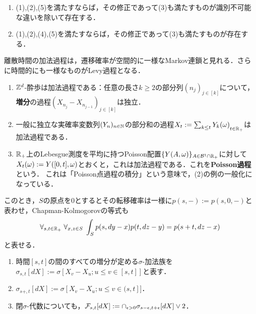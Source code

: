 \documentclass[uplatex,dvipdfmx]{jsreport}
\begin{document}
\begin{theorem}[$D$-変形]\mbox{}
    \begin{enumerate}
        \item (1),(2),(5)を満たすならば，その修正であって(3)も満たすものが識別不可能な違いを除いて存在する．
        \item (1),(2),(4),(5)を満たすならば，その修正であって(3)も満たすものが存在する．
    \end{enumerate}
\end{theorem}

\begin{example}
    離散時間の加法過程は，遷移確率が空間的に一様なMarkov連鎖と見れる．さらに時間的にも一様なものがLevy過程となる．
    \begin{enumerate}
        \item $\mathbb{Z}^d$-酔歩は加法過程である：任意の長さ$k\ge2$の部分列$(n_j)_{j\in[k]}$について，\textbf{増分}の過程$(X_{n_j}-X_{n_{j-1}})_{j\in[k]}$は独立．
        \item 一般に独立な実確率変数列$(Y_n)_{n\in\mathbb{N}}$の部分和の過程${X_t:=\sum_{k\le t}Y_k(\omega)}_{t\in\mathbb{R}_+}$は加法過程である．
        \item $\mathbb{R}_+$上のLebesgue測度を平均に持つPoisson配置$\{Y(A,\omega)\}_{A\in\mathcal{B}^1\cap\mathbb{R}_+}$に対して$X_t(\omega):=Y([0,t],\omega)$とおくと，これは加法過程である．これを\textbf{Poisson過程}という．
        これは「Poisson点過程の積分」という意味で，(2)の例の一般化になっている．
    \end{enumerate}
\end{example}

\begin{remark}
    このとき，$S$の原点を$0$とするとその転移確率は一様に$p(s,-):=p(s,0,-)$と表わせ，Chapman-Kolmogorovの等式も
    \[\forall_{s,t\in\mathbb{R}_+}\;\forall_{x,z\in S}\;\int_Sp(s,dy-x)p(t,dz-y)=p(s+t,dz-x)\]
    と表せる．
\end{remark}

\begin{notation}\mbox{}
    \begin{enumerate}
        \item 時間$[s,t]$の間のすべての増分が定める$\sigma$-加法族を$\sigma_{s,t}[dX]:=\sigma[X_v-X_u;u\le v\in[s,t]]$と表す．
        \item $\sigma_{s+,t}[dX]:=\sigma[X_v-X_u;u\le v\in(s,t]]$．
        \item 閉$\sigma$-代数についても，$\mathcal{F}_{s,t}[dX]:=\cap_{\epsilon>0}\sigma_{s-\epsilon,t+\epsilon}[dX]\lor 2$．
    \end{enumerate}
\end{notation}
\end{document}
